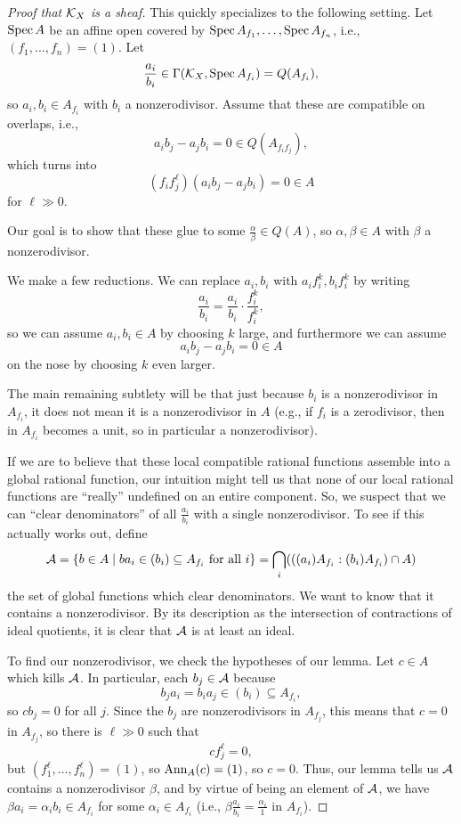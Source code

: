 \documentclass[12pt]{article}
\begin{document}
\begin{proof}[Proof that $\mathcal{K}_X$ is a sheaf]
    This quickly specializes to the following setting. Let $\operatorname{Spec} A$ be an affine open covered by $\operatorname{Spec} A_{f_1},\dots,\operatorname{Spec} A_{f_n}$, i.e., $(f_1,\dots,f_n)=(1)$. Let
    \[\frac{a_i}{b_i} \in \Gamma(\mathcal{K}_X,\operatorname{Spec} A_{f_i}) = Q(A_{f_i}),\]
    so $a_i,b_i\in A_{f_i}$ with $b_i$ a nonzerodivisor. Assume that these are compatible on overlaps, i.e.,
    \[a_i b_j - a_j b_i = 0 \in Q(A_{f_i f_j}),\]
    which turns into
    \[(f_i f_j^\ell)(a_i b_j - a_j b_i) = 0 \in A\]
    for $\ell \gg 0$.
    
    Our goal is to show that these glue to some $\frac{\alpha}{\beta}\in Q(A)$, so $\alpha,\beta\in A$ with $\beta$ a nonzerodivisor.

    We make a few reductions. We can replace $a_i,b_i$ with $a_i f_i^k, b_i f_i^k$ by writing
    \[\frac{a_i}{b_i} = \frac{a_i}{b_i}\cdot \frac{f_i^k}{f_i^k},\]
    so we can assume $a_i,b_i \in A$ by choosing $k$ large, and furthermore we can assume
    \[a_i b_j - a_j b_i = 0 \in A\]
    on the nose by choosing $k$ even larger.

    The main remaining subtlety will be that just because $b_i$ is a nonzerodivisor in $A_{f_i}$, it does not mean it is a nonzerodivisor in $A$ (e.g., if $f_i$ is a zerodivisor, then in $A_{f_i}$ becomes a unit, so in particular a nonzerodivisor).

    If we are to believe that these local compatible rational functions assemble into a global rational function, our intuition might tell us that none of our local rational functions are ``really'' undefined on an entire component. So, we suspect that we can ``clear denominators'' of all $\frac{a_i}{b_i}$ with a single nonzerodivisor. To see if this actually works out, define
    \[\mathcal{A} = \{b\in A \mid ba_i \in (b_i) \subseteq A_{f_i} \text{ for all $i$}\} = \bigcap_i (((a_i)A_{f_i} : (b_i)A_{f_i})\cap A)\]
    the set of global functions which clear denominators. We want to know that it contains a nonzerodivisor. By its description as the intersection of contractions of ideal quotients, it is clear that $\mathcal{A}$ is at least an ideal. 
    
    To find our nonzerodivisor, we check the hypotheses of our lemma. Let $c\in A$ which kills $\mathcal{A}$. In particular, each $b_j \in \mathcal{A}$ because
    \[b_j a_i = b_i a_j \in (b_i) \subseteq A_{f_i},\]
    so $cb_j = 0$ for all $j$. Since the $b_j$ are nonzerodivisors in $A_{f_j}$, this means that $c=0$ in $A_{f_j}$, so there is $\ell \gg 0$ such that
    \[c f_j^\ell = 0,\]
    but $(f_1^\ell,\dots,f_n^\ell)=(1)$, so $\mathrm{Ann}_A(c)=(1)$, so $c=0$. Thus, our lemma tells us $\mathcal{A}$ contains a nonzerodivisor $\beta$, and by virtue of being an element of $\mathcal{A}$, we have $\beta a_i = \alpha_i b_i \in A_{f_i}$ for some $\alpha_i\in A_{f_i}$ (i.e., $\beta\frac{a_i}{b_i} = \frac{\alpha_i}{1}$ in $A_{f_i}$). 
    

\end{proof}
\end{document}

